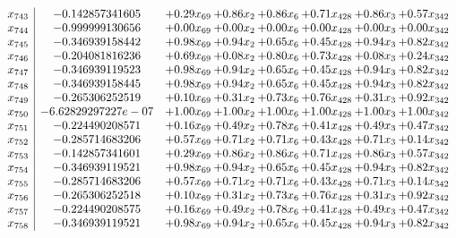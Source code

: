 \documentclass[8pt]{article}
\begin{document}
\[\begin{array}{c| c c@{\hskip 2pt} c@{\hskip 2pt} c@{\hskip 2pt} c@{\hskip 2pt} c@{\hskip 2pt} c@{\hskip 2pt} }
 x_{743}   &  -0.142857341605 & +  0.29 x_{69} & +  0.86 x_{2} & +  0.86 x_{6} & +  0.71 x_{428} & +  0.86 x_{3} & +  0.57 x_{342}\\
 x_{744}   &  -0.999999130656 & +  0.00 x_{69} & +  0.00 x_{2} & +  0.00 x_{6} & +  0.00 x_{428} & +  0.00 x_{3} & +  0.00 x_{342}\\
 x_{745}   &  -0.346939158442 & +  0.98 x_{69} & +  0.94 x_{2} & +  0.65 x_{6} & +  0.45 x_{428} & +  0.94 x_{3} & +  0.82 x_{342}\\
 x_{746}   &  -0.204081816236 & +  0.69 x_{69} & +  0.08 x_{2} & +  0.80 x_{6} & +  0.73 x_{428} & +  0.08 x_{3} & +  0.24 x_{342}\\
 x_{747}   &  -0.346939119523 & +  0.98 x_{69} & +  0.94 x_{2} & +  0.65 x_{6} & +  0.45 x_{428} & +  0.94 x_{3} & +  0.82 x_{342}\\
 x_{748}   &  -0.346939158445 & +  0.98 x_{69} & +  0.94 x_{2} & +  0.65 x_{6} & +  0.45 x_{428} & +  0.94 x_{3} & +  0.82 x_{342}\\
 x_{749}   &  -0.265306252519 & +  0.10 x_{69} & +  0.31 x_{2} & +  0.73 x_{6} & +  0.76 x_{428} & +  0.31 x_{3} & +  0.92 x_{342}\\
 x_{750}   &  -6.62829297227e-07 & +  1.00 x_{69} & +  1.00 x_{2} & +  1.00 x_{6} & +  1.00 x_{428} & +  1.00 x_{3} & +  1.00 x_{342}\\
 x_{751}   &  -0.224490208571 & +  0.16 x_{69} & +  0.49 x_{2} & +  0.78 x_{6} & +  0.41 x_{428} & +  0.49 x_{3} & +  0.47 x_{342}\\
 x_{752}   &  -0.285714683206 & +  0.57 x_{69} & +  0.71 x_{2} & +  0.71 x_{6} & +  0.43 x_{428} & +  0.71 x_{3} & +  0.14 x_{342}\\
 x_{753}   &  -0.142857341601 & +  0.29 x_{69} & +  0.86 x_{2} & +  0.86 x_{6} & +  0.71 x_{428} & +  0.86 x_{3} & +  0.57 x_{342}\\
 x_{754}   &  -0.346939119521 & +  0.98 x_{69} & +  0.94 x_{2} & +  0.65 x_{6} & +  0.45 x_{428} & +  0.94 x_{3} & +  0.82 x_{342}\\
 x_{755}   &  -0.285714683206 & +  0.57 x_{69} & +  0.71 x_{2} & +  0.71 x_{6} & +  0.43 x_{428} & +  0.71 x_{3} & +  0.14 x_{342}\\
 x_{756}   &  -0.265306252518 & +  0.10 x_{69} & +  0.31 x_{2} & +  0.73 x_{6} & +  0.76 x_{428} & +  0.31 x_{3} & +  0.92 x_{342}\\
 x_{757}   &  -0.224490208575 & +  0.16 x_{69} & +  0.49 x_{2} & +  0.78 x_{6} & +  0.41 x_{428} & +  0.49 x_{3} & +  0.47 x_{342}\\
 x_{758}   &  -0.346939119521 & +  0.98 x_{69} & +  0.94 x_{2} & +  0.65 x_{6} & +  0.45 x_{428} & +  0.94 x_{3} & +  0.82 x_{342}\\

\end{array}\]
\end{document}
